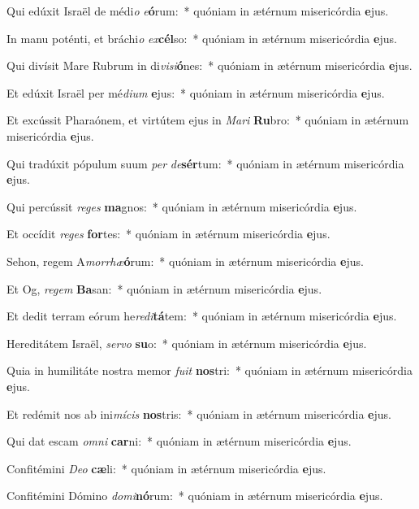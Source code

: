 \item Qui edúxit Israël de médi\textit{o} \textit{e}\textbf{ó}rum:~* quóniam in ætérnum misericórdia \textbf{e}jus.
\item In manu poténti, et bráchi\textit{o} \textit{ex}\textbf{cél}so:~* quóniam in ætérnum misericórdia \textbf{e}jus.
\item Qui divísit Mare Rubrum in di\textit{vi}\textit{si}\textbf{ó}nes:~* quóniam in ætérnum misericórdia \textbf{e}jus.
\item Et edúxit Israël per mé\textit{di}\textit{um} \textbf{e}jus:~* quóniam in ætérnum misericórdia \textbf{e}jus.
\item Et excússit Pharaónem, et virtútem ejus in \textit{Ma}\textit{ri} \textbf{Ru}bro:~* quóniam in ætérnum misericórdia \textbf{e}jus.
\item Qui tradúxit pópulum suum \textit{per} \textit{de}\textbf{sér}tum:~* quóniam in ætérnum misericórdia \textbf{e}jus.
\item Qui percússit \textit{re}\textit{ges} \textbf{ma}gnos:~* quóniam in ætérnum misericórdia \textbf{e}jus.
\item Et occídit \textit{re}\textit{ges} \textbf{for}tes:~* quóniam in ætérnum misericórdia \textbf{e}jus.
\item Sehon, regem A\textit{mor}\textit{rhæ}\textbf{ó}rum:~* quóniam in ætérnum misericórdia \textbf{e}jus.
\item Et Og, \textit{re}\textit{gem} \textbf{Ba}san:~* quóniam in ætérnum misericórdia \textbf{e}jus.
\item Et dedit terram eórum he\textit{re}\textit{di}\textbf{tá}tem:~* quóniam in ætérnum misericórdia \textbf{e}jus.
\item Hereditátem Israël, \textit{ser}\textit{vo} \textbf{su}o:~* quóniam in ætérnum misericórdia \textbf{e}jus.
\item Quia in humilitáte nostra memor \textit{fu}\textit{it} \textbf{nos}tri:~* quóniam in ætérnum misericórdia \textbf{e}jus.
\item Et redémit nos ab ini\textit{mí}\textit{cis} \textbf{nos}tris:~* quóniam in ætérnum misericórdia \textbf{e}jus.
\item Qui dat escam \textit{om}\textit{ni} \textbf{car}ni:~* quóniam in ætérnum misericórdia \textbf{e}jus.
\item Confitémini \textit{De}\textit{o} \textbf{cæ}li:~* quóniam in ætérnum misericórdia \textbf{e}jus.
\item Confitémini Dómino \textit{do}\textit{mi}\textbf{nó}rum:~* quóniam in ætérnum misericórdia \textbf{e}jus.
